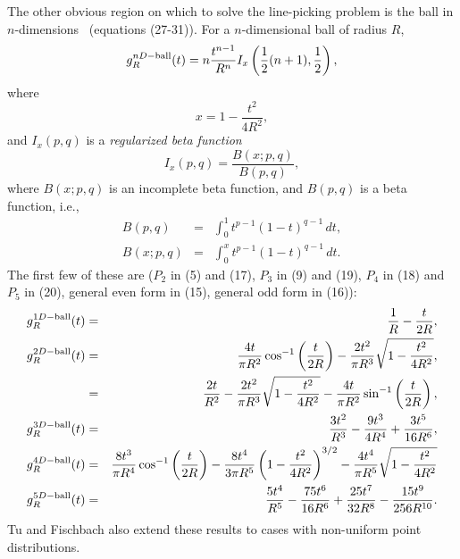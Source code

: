 \documentclass{article}
\begin{document}
The other obvious region on which to solve the line-picking problem is
the ball in $n$-dimensions~\cite{tu00:_circle_line} (equations
(27-31)). For a $n$-dimensional ball of radius $R$,
\begin{equation}
 g^{nD-{\rm ball}}_R(t) = n \frac{t^{n-1}}{R^n} I_x\left( 
  \frac{1}{2} (n+1), \frac{1}{2}
                      \right),
\end{equation}
where
\begin{equation}
 x = 1 - \frac{t^2}{4 R^2}, 
\end{equation}
and $I_x(p,q)$ is a {\em regularized beta function}
\begin{equation}
   I_x(p,q) = \frac{ B(x; p,q)}{B(p,q)},
\end{equation}
where $B(x; p,q)$ is an incomplete beta function, and $B(p,q)$ is a
beta function, i.e., 
\begin{eqnarray}
  B(p,q)    & = & \int_0^1 t^{p-1} (1 - t)^{q-1} \, dt, \\
  B(x; p,q) & = & \int_0^x t^{p-1} (1 - t)^{q-1} \, dt.
\end{eqnarray}
The first few of these are \cite{tu00:_circle_line} ($P_2$ in (5) and
(17), $P_3$ in (9) and (19), $P_4$ in (18) and $P_5$ in (20), general
even form in (15), general odd form in (16)):
\begin{eqnarray}
  \label{eq:ball_line_picking}
  g^{1D-{\rm ball}}_R(t) & = & \frac{1}{R} - \frac{t}{2 R}   \label{eq:line_line_picking}, \\
  g^{2D-{\rm ball}}_R(t) & = & \frac{4 t}{\pi R^2} \cos^{-1} \left( \frac{t}{2R} \right)
               - \frac{2 t^2}{\pi R^3} \sqrt{1 - \frac{t^2}{4 R^2} } \label{eq:2dball_line_picking} , \\
          & = & \frac{2 t}{R^2} 
               - \frac{2 t^2}{\pi R^3} \sqrt{1 - \frac{t^2}{4 R^2} }
               - \frac{4 t}{\pi R^2} \sin^{-1} \left( \frac{t}{2R} \right) \label{eq:2dball_line_picking2} ,  \\
  g^{3D-{\rm ball}}_R(t) & = & \frac{3 t^2}{R^3} - \frac{9 t^3}{4 R^4} + \frac{3 t^5}{16 R^6}   \label{eq:sphere_line_picking}  , \\
  g^{4D-{\rm ball}}_R(t) & = &  \frac{8 t^3}{\pi R^4} \cos^{-1} \left( \frac{t}{2R} \right) 
              - \frac{8 t^4}{3 \pi R^5} \left( 1 - \frac{t^2}{4 R^2} \right)^{3/2}
               - \frac{4 t^4}{\pi R^5} \sqrt{1 - \frac{t^2}{4 R^2} } \\
  g^{5D-{\rm ball}}_R(t) & = & \frac{5 t^4}{R^5} - \frac{75 t^6}{16 R^6} + \frac{25 t^7}{32 R^8} - \frac{15 t^9}{256 R^{10}} .
  \label{eq:ball_line_picking-end}
\end{eqnarray}
Tu and Fischbach \cite{tu00:_circle_line} also extend these results to
cases with non-uniform point distributions.
 
\end{document}

